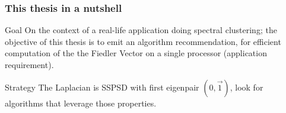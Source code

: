 \begin{frame}
  \frametitle{This thesis in a nutshell}
  \begin{block}{Goal}
    On the context of a real-life application doing spectral
    clustering; the objective of this thesis is to emit an algorithm
    recommendation, for efficient 
    computation of the the Fiedler Vector on a single processor
    (application requirement). 
  \end{block}
  \begin{block}{Strategy}
    The Laplacian is SSPSD with first eigenpair $(0,\vec{1})$, look
    for algorithms that leverage those properties. 
  \end{block}  
\end{frame}
